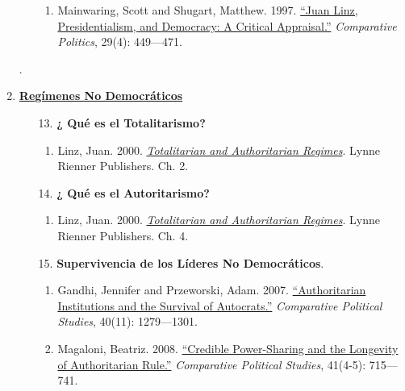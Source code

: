\documentclass[letterpaper]{article}
\begin{document}
\begin{enumerate}
\begin{enumerate}
\begin{enumerate}
						\item Mainwaring, Scott and Shugart, Matthew. 1997. \href{https://github.com/hbahamonde/Ciencia_Politica_I/raw/master/Readings/Mainwaring_Shugart.pdf}{``Juan Linz, Presidentialism, and Democracy: A Critical Appraisal.''} \emph{Comparative Politics}, 29(4): 449---471.%
					\end{enumerate}
				\end{enumerate}

{\huge{\color{blue}\Pointinghand}} {\large{\color{red}{\bf Midterm para la casa. Entra todo lo visto hasta el momento}.}}

		\item {\bf \underline{Reg\'imenes No Democr\'aticos}}
			\begin{enumerate}
				
				\item[13.] {\bf ¿ Qu\'e es el Totalitarismo?}
					\begin{enumerate}
						\item Linz, Juan. 2000. \href{https://github.com/hbahamonde/Ciencia_Politica_I/raw/master/Readings/Linz_2000.pdf}{\emph{Totalitarian and Authoritarian Regimes}}. Lynne Rienner Publishers. Ch. 2.
					\end{enumerate}

				\item[14.] {\bf ¿ Qu\'e es el Autoritarismo?}
					\begin{enumerate}
						\item Linz, Juan. 2000. \href{https://github.com/hbahamonde/Ciencia_Politica_I/raw/master/Readings/Linz_2000.pdf}{\emph{Totalitarian and Authoritarian Regimes}}. Lynne Rienner Publishers. Ch. 4.
					\end{enumerate}

				\item[15.] {\bf Supervivencia de los L\'ideres No Democr\'aticos}.
					\begin{enumerate}
						\item Gandhi, Jennifer and Przeworski, Adam. 2007. \href{https://github.com/hbahamonde/Ciencia_Politica_I/raw/master/Readings/Gandhi_Przeworski.pdf}{``Authoritarian Institutions and the Survival of Autocrats.''} \emph{Comparative Political Studies}, 40(11): 1279---1301.
						
						\item Magaloni, Beatriz. 2008. \href{https://github.com/hbahamonde/Ciencia_Politica_I/raw/master/Readings/Magaloni.pdf}{``Credible Power-Sharing and the Longevity of Authoritarian Rule.''} \emph{Comparative Political Studies}, 41(4-5): 715---741.
					\end{enumerate}
				



\end{enumerate}
\end{enumerate}
\end{document}
